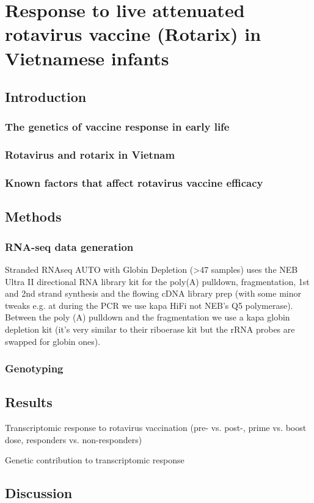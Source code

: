 %
%

\chapter{Response to live attenuated rotavirus vaccine (Rotarix) in Vietnamese infants}

\section{Introduction}

\subsection{The genetics of vaccine response in early life}

\subsection{Rotavirus and rotarix in Vietnam}

\subsection{Known factors that affect rotavirus vaccine efficacy}

\section{Methods}

\subsection{RNA-seq data generation}

Stranded RNAseq AUTO with Globin Depletion (>47 samples) uses the NEB Ultra
II directional RNA library kit for the poly(A) pulldown, fragmentation, 1st and
2nd strand synthesis and the flowing cDNA library prep (with some minor tweaks
e.g. at during the PCR we use kapa HiFi not NEB's Q5 polymerase). Between the
poly (A) pulldown and the fragmentation we use a kapa globin depletion kit
(it's very similar to their riboerase kit but the rRNA probes are swapped for
globin ones).

\subsection{Genotyping}

\section{Results}

Transcriptomic response to rotavirus vaccination (pre- vs. post-, prime vs. boost dose, responders vs. non-responders)

Genetic contribution to transcriptomic response

\section{Discussion}

